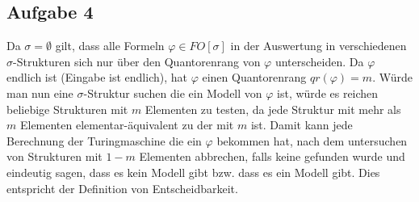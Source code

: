 \documentclass[a4paper,10pt]{article}
\begin{document}
\subsection*{Aufgabe 4}
Da $\sigma = \emptyset$ gilt, dass alle Formeln $\varphi \in FO[\sigma]$ in der Auswertung in verschiedenen $\sigma$-Strukturen sich nur über den Quantorenrang von $\varphi$ unterscheiden. Da $\varphi$ endlich ist (Eingabe ist endlich), hat $\varphi$ einen Quantorenrang $qr(\varphi) = m$. Würde man nun eine $\sigma$-Struktur suchen die ein Modell von $\varphi$ ist, würde es reichen beliebige Strukturen  mit $m$ Elementen zu testen, da jede Struktur mit mehr als $m$ Elementen elementar-äquivalent zu der mit $m$ ist. Damit kann jede Berechnung der Turingmaschine die ein $\varphi$ bekommen hat, nach dem untersuchen von Strukturen mit $1-m$ Elementen abbrechen, falls keine gefunden wurde und eindeutig sagen, dass es kein Modell gibt bzw. dass es ein Modell gibt. Dies entspricht der Definition von Entscheidbarkeit.
\end{document}
